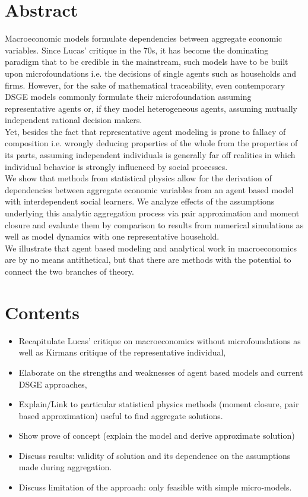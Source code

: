 

\section*{Abstract}

Macroeconomic models formulate dependencies between aggregate economic variables. Since Lucas' critique in the 70s, it has become the dominating paradigm that to be credible in the mainstream, such models have to be built upon microfoundations i.e. the decisions of single agents such as households and firms. However, for the sake of mathematical traceability, even contemporary DSGE models commonly formulate their microfoundation assuming representative agents or, if they model heterogeneous agents, assuming mutually independent rational decision makers. \\
Yet, besides the fact that representative agent modeling is prone to fallacy of composition i.e. wrongly deducing properties of the whole from the properties of its parts, assuming independent individuals is generally far off realities in which individual behavior is strongly influenced by social processes. \\
We show that methods from statistical physics allow for the derivation of dependencies between aggregate economic variables from an agent based model with interdependent social learners. 
We analyze effects of the assumptions underlying this analytic aggregation process via pair approximation and moment closure and evaluate them by comparison to results from numerical simulations as well as model dynamics with one representative household. \\
We illustrate that agent based modeling and analytical work in macroeconomics are by no means antithetical, but that there are methods with the potential to connect the two branches of theory. \\

\section*{Contents}
\begin{itemize}
	\item Recapitulate Lucas' critique on macroeconomics without microfoundations as well as Kirmans critique of the representative individual,
	\item Elaborate on the strengths and weaknesses of agent based models and current DSGE approaches,
	\item Explain/Link to particular statistical physics methods (moment closure, pair based approximation) useful to find aggregate solutions.
	\item Show prove of concept (explain the model and derive approximate solution)
	\item Discuss results: validity of solution and its dependence on the assumptions made during aggregation.
	\item Discuss limitation of the approach: only feasible with simple micro-models.
\end{itemize}


